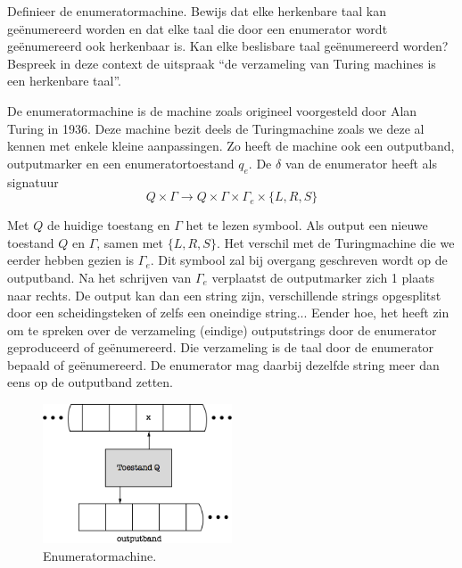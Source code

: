\begin{quest}[Enumeratormachine]
	Definieer de enumeratormachine. Bewijs dat elke herkenbare taal kan ge\"enumereerd worden en dat elke taal die door een enumerator wordt ge\"enumereerd ook herkenbaar is. Kan elke beslisbare taal ge\"enumereerd worden? Bespreek in deze context de uitspraak ``de verzameling van Turing machines is een herkenbare taal''.
\end{quest}

De enumeratormachine is de machine zoals origineel voorgesteld door Alan Turing in 1936. Deze machine bezit deels de Turingmachine zoals we deze al kennen met enkele kleine aanpassingen. Zo heeft de machine ook een outputband, outputmarker en een enumeratortoestand $q_e$. De $\delta$ van de enumerator heeft als signatuur $$Q \times \Gamma \rightarrow Q \times \Gamma \times \Gamma_e \times \{L,R,S\}$$

Met $Q$ de huidige toestang en $\Gamma$ het te lezen symbool. Als output een nieuwe toestand $Q$ en $\Gamma$, samen met $\{L,R,S\}$. Het verschil met de Turingmachine die we eerder hebben gezien is $\Gamma_e$. Dit symbool zal bij overgang geschreven wordt op de outputband. Na het schrijven van $\Gamma_e$ verplaatst de outputmarker zich 1 plaats naar rechts. De output kan dan een string zijn, verschillende strings opgesplitst door een scheidingsteken  of zelfs een oneindige string... Eender hoe, het heeft zin om te spreken over de verzameling (eindige) outputstrings door de enumerator geproduceerd of ge\"enumereerd. Die verzameling is de taal door de enumerator bepaald of ge\"enumereerd. De enumerator mag daarbij dezelfde string meer dan eens op de outputband zetten.

\vspace{3mm}
\begin{figure}[h!]
  \centering
      \includegraphics[width=0.5\textwidth]{./img/enumerator}
  \caption{Enumeratormachine.}
\end{figure}
\vspace{3mm}

